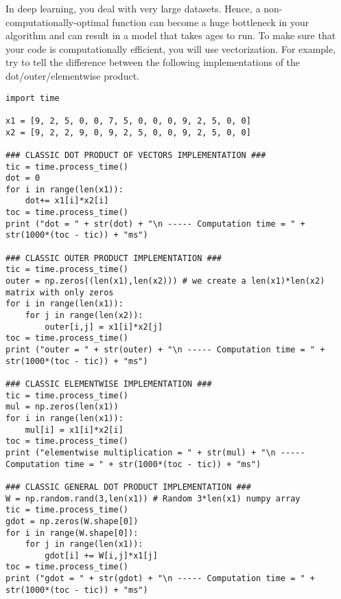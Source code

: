 In deep learning, you deal with very large datasets. Hence, a non-computationally-optimal function can become a huge bottleneck in your algorithm and can result in a model that takes ages to run. To make sure that your code is computationally efficient, you will use vectorization. For example, try to tell the difference between the following implementations of the dot/outer/elementwise product.
\begin{verbatim}
import time

x1 = [9, 2, 5, 0, 0, 7, 5, 0, 0, 0, 9, 2, 5, 0, 0]
x2 = [9, 2, 2, 9, 0, 9, 2, 5, 0, 0, 9, 2, 5, 0, 0]

### CLASSIC DOT PRODUCT OF VECTORS IMPLEMENTATION ###
tic = time.process_time()
dot = 0
for i in range(len(x1)):
    dot+= x1[i]*x2[i]
toc = time.process_time()
print ("dot = " + str(dot) + "\n ----- Computation time = " + str(1000*(toc - tic)) + "ms")

### CLASSIC OUTER PRODUCT IMPLEMENTATION ###
tic = time.process_time()
outer = np.zeros((len(x1),len(x2))) # we create a len(x1)*len(x2) matrix with only zeros
for i in range(len(x1)):
    for j in range(len(x2)):
        outer[i,j] = x1[i]*x2[j]
toc = time.process_time()
print ("outer = " + str(outer) + "\n ----- Computation time = " + str(1000*(toc - tic)) + "ms")

### CLASSIC ELEMENTWISE IMPLEMENTATION ###
tic = time.process_time()
mul = np.zeros(len(x1))
for i in range(len(x1)):
    mul[i] = x1[i]*x2[i]
toc = time.process_time()
print ("elementwise multiplication = " + str(mul) + "\n ----- Computation time = " + str(1000*(toc - tic)) + "ms")

### CLASSIC GENERAL DOT PRODUCT IMPLEMENTATION ###
W = np.random.rand(3,len(x1)) # Random 3*len(x1) numpy array
tic = time.process_time()
gdot = np.zeros(W.shape[0])
for i in range(W.shape[0]):
    for j in range(len(x1)):
        gdot[i] += W[i,j]*x1[j]
toc = time.process_time()
print ("gdot = " + str(gdot) + "\n ----- Computation time = " + str(1000*(toc - tic)) + "ms")

\end{verbatim}

